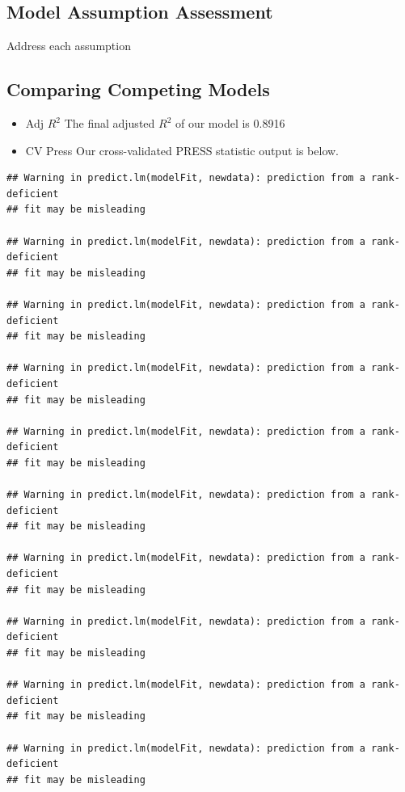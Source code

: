 \documentclass[american,]{article}
\theoremstyle{definition}
\theoremstyle{definition}
\theoremstyle{definition}
\theoremstyle{remark}
\begin{document}
\hypertarget{model-assumption-assessment}{%
\subsection{Model Assumption
Assessment}\label{model-assumption-assessment}}

Address each assumption

\hypertarget{comparing-competing-models-1}{%
\subsection{Comparing Competing
Models}\label{comparing-competing-models-1}}

\begin{itemize}
\item
  Adj \(R^2\) The final adjusted \(R^2\) of our model is 0.8916
\item
  CV Press Our cross-validated PRESS statistic output is below.
\end{itemize}

\begin{verbatim}
## Warning in predict.lm(modelFit, newdata): prediction from a rank-deficient
## fit may be misleading

## Warning in predict.lm(modelFit, newdata): prediction from a rank-deficient
## fit may be misleading

## Warning in predict.lm(modelFit, newdata): prediction from a rank-deficient
## fit may be misleading

## Warning in predict.lm(modelFit, newdata): prediction from a rank-deficient
## fit may be misleading

## Warning in predict.lm(modelFit, newdata): prediction from a rank-deficient
## fit may be misleading

## Warning in predict.lm(modelFit, newdata): prediction from a rank-deficient
## fit may be misleading

## Warning in predict.lm(modelFit, newdata): prediction from a rank-deficient
## fit may be misleading

## Warning in predict.lm(modelFit, newdata): prediction from a rank-deficient
## fit may be misleading

## Warning in predict.lm(modelFit, newdata): prediction from a rank-deficient
## fit may be misleading

## Warning in predict.lm(modelFit, newdata): prediction from a rank-deficient
## fit may be misleading
\end{verbatim}
\end{document}
